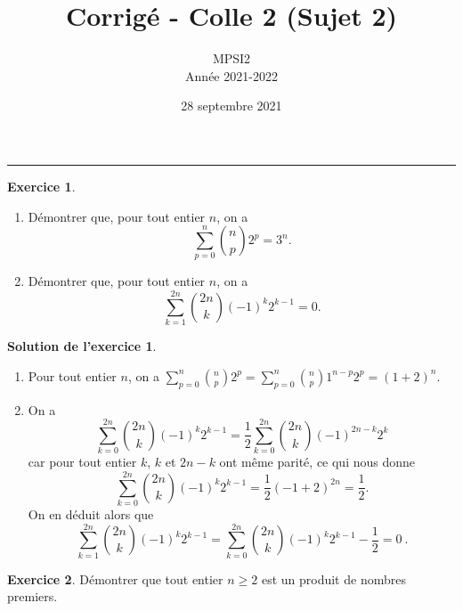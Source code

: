 \documentclass[a4paper, 11pt,openany]{article}%
\title{Corrigé - Colle 2 (Sujet 2)}
\author{MPSI2\\
Année 2021-2022}
\date{28 septembre 2021}
\theoremstyle{plain}
\theoremstyle{definition}
\newtheorem{exo}{Exercice}
\newtheorem{sol}{Solution de l'exercice}
\theoremstyle{remark}
\begin{document}
   \maketitle
      \rule{\linewidth}{0.5mm}


\begin{exo}
	\begin{enumerate}
		\item Démontrer que, pour tout entier $n$, on a $$\sum_{p=0}^n\binom{n}{p}2^p = 3^n.$$
		\item Démontrer que, pour tout entier $n$, on a $$\sum_{k=1}^{2n} \binom{2n}{k}(-1)^k2^{k-1} = 0.$$
	\end{enumerate}
\end{exo}

\begin{sol}
	\begin{enumerate}
		\item Pour tout entier $n$, on a $\sum_{p=0}^n\binom{n}{p}2^p = \sum_{p=0}^n\binom{n}{p}1^{n-p}2^p=(1+2)^n$.
		\item On a 
		\[
			\sum_{k=0}^{2n}	\binom{2n}{k}(-1)^k2^{k-1} = \frac{1}{2} \sum_{k=0}^{2n} \binom{2n}{k}(-1)^{2n-k}2^{k}
		\]
		car pour tout entier $k$, $k$ et $2n-k$ ont même parité, ce qui nous donne 
		\[
			\sum_{k=0}^{2n}	\binom{2n}{k}(-1)^k2^{k-1} = \frac{1}{2} (-1+2)^{2n} = \frac{1}{2}.
		\]
		On en déduit alors que 
		\[
			\sum_{k=1}^{2n}	\binom{2n}{k}(-1)^k2^{k-1} = \sum_{k=0}^{2n}	\binom{2n}{k}(-1)^k2^{k-1} - \frac{1}{2} = 0 \ .
		\]
	\end{enumerate}
\end{sol}


\begin{exo}
Démontrer que tout entier $n\geqslant 2$ est un produit de nombres premiers.
\end{exo}
\end{document}
